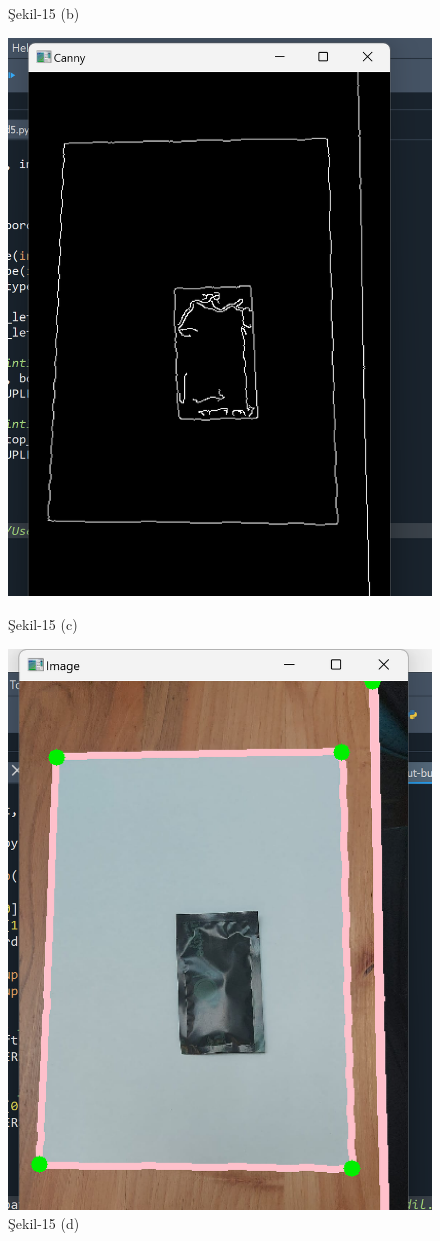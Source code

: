 \documentclass[11pt,a4paper]{report}
\begin{document}
\begin{figure}[!h]
\begin{minipage}[t]{0.470\linewidth}
			\caption*{Şekil-15 (b)}
		\end{minipage}
			\begin{minipage}[t]{0.470\linewidth}
			\centering
			\includegraphics[width=0.65\linewidth]{nesne-2-siyah-beyaz}
			\caption*{Şekil-15 (c)}
		\end{minipage}\hfill
		\begin{minipage}[t]{0.470\linewidth}
			\centering
			\includegraphics[width=0.65\linewidth]{nesne-2-a4}
			\caption*{Şekil-15 (d)}

\end{minipage}
\end{figure}
\end{document}
